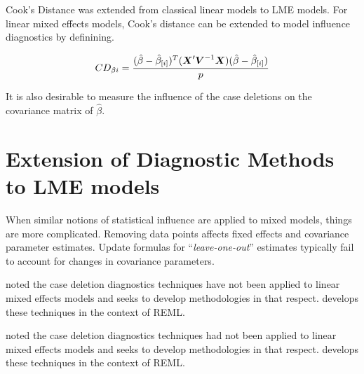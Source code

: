 \documentclass[12pt, a4paper]{article}
\begin{document}
Cook's Distance was extended from classical linear models to LME models.  For linear mixed effects models, Cook's distance can be extended to model influence diagnostics by definining.

\[ CD_{\beta i} = {(\hat{\beta} - \hat{\beta}_{[i]})^{T}(\boldsymbol{X}^{\prime}\boldsymbol{V}^{-1}\boldsymbol{X}) (\hat{\beta} - \hat{\beta}_{[i]}) \over p}\]

It is also desirable to measure the influence of the case deletions on the covariance matrix of $\hat{\beta}$.





\section{Extension of Diagnostic Methods to LME models}

When similar notions of statistical influence are applied to mixed models,
things are more complicated. Removing data points affects fixed effects and covariance parameter estimates.
Update formulas for “\textit{leave-one-out}” estimates typically fail to account for changes in covariance
parameters. 
%
%

\citet{Christiansen} noted the case deletion diagnostics techniques have not been applied to linear mixed effects models and seeks to develop methodologies in that respect. \citet{Christiansen} develops these techniques in the context of REML.

\citet{CPJ} noted the case deletion diagnostics techniques had not been applied to linear mixed effects models and seeks to develop methodologies in that respect. \citet{CPJ} develops these techniques in the context of REML.

\end{document}
